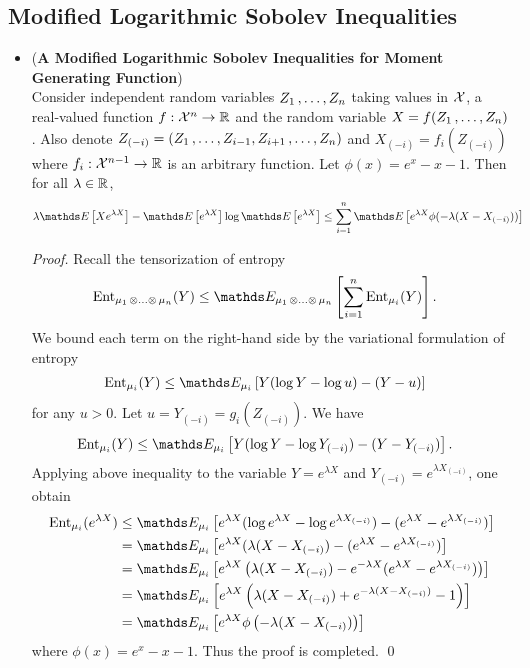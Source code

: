 \documentclass[11pt]{article}
\begin{document}
\subsection{Modified Logarithmic Sobolev Inequalities}
\begin{itemize}
\item \begin{proposition} (\textbf{A Modified Logarithmic Sobolev Inequalities for Moment Generating Function}) \citep{boucheron2013concentration}\\
Consider independent random variables $Z_1 \,{,}\ldots{,}\, Z_n$ taking values in ${\mathcal X}$, a real-valued function $f: {\mathcal X}^n \to {\mathbb R}$ and the random variable $X = f(Z_1 \,{,}\ldots{,}\, Z_n)$. Also denote $Z_{(-i)}= (Z_1 \,{,}\ldots{,}\, Z_{i-1}, Z_{i+1} \,{,}\ldots{,}\, Z_n)$ and $X_{(-i)} = f_i(Z_{(-i)})$ where $f_i: {\mathcal X}^{n-1} \to {\mathbb R}$ is an arbitrary function. Let $\phi(x) = e^x -x -1$.
Then for all $\lambda \in {\mathbb R}$,
\begin{align}
\lambda \E{}{Xe^{\lambda X}} - \E{}{e^{\lambda X}}\log\E{}{e^{\lambda X}} &\le \sum_{i=1}^{n}\E{}{e^{\lambda X}\phi(-\lambda(X - X_{(-i)}))}\label{ineqn: log_sobolev_inequality_mgf}
\end{align}
\end{proposition}
\begin{proof}
Recall the tensorization of entropy
\begin{align*}
\text{Ent}_{\mu_1 \xdotx{\otimes} \mu_n}(Y) &\le \E{\mu_1 \xdotx{\otimes} \mu_n}{\sum_{i=1}^{n}\text{Ent}_{\mu_i}(Y)}.
\end{align*}  We bound each term on the right-hand side by the variational formulation of entropy
\begin{align*}
\text{Ent}_{\mu_i}(Y) &\le \E{\mu_i}{Y(\log Y - \log u) - (Y -u)}
\end{align*} for any $u > 0$. Let $u = Y_{(-i)} = g_i(Z_{(-i)})$. We have
\begin{align*}
\text{Ent}_{\mu_i}(Y) &\le \E{\mu_i}{Y(\log Y - \log Y_{(-i)}) - (Y - Y_{(-i)})}.
\end{align*}Applying above inequality to the variable $Y = e^{\lambda X}$ and $Y_{(-i)} = e^{\lambda X_{(-i)}}$, one obtain
\begin{align*}
\text{Ent}_{\mu_i}(e^{\lambda X}) &\le \E{\mu_i}{e^{\lambda X}(\log e^{\lambda X} - \log e^{\lambda X_{(-i)}}) - (e^{\lambda X} - e^{\lambda X_{(-i)}})}\\
&= \E{\mu_i}{e^{\lambda X}(\lambda (X - X_{(-i)}) - (e^{\lambda X} - e^{\lambda X_{(-i)}})}\\
&= \E{\mu_i}{e^{\lambda X}\paren{\lambda (X - X_{(-i)}) - e^{-\lambda X}(e^{\lambda X} - e^{\lambda X_{(-i)}})}}\\
&= \E{\mu_i}{e^{\lambda X}\paren{\lambda (X - X_{(-i)}) + e^{-\lambda (X - X_{(-i)})} -1}}\\
&= \E{\mu_i}{e^{\lambda X}\phi\paren{-\lambda (X - X_{(-i)})}}
\end{align*} where $\phi(x) = e^x -x -1$. Thus the proof is completed. \qed
\end{proof}



\end{itemize}
\end{document}
